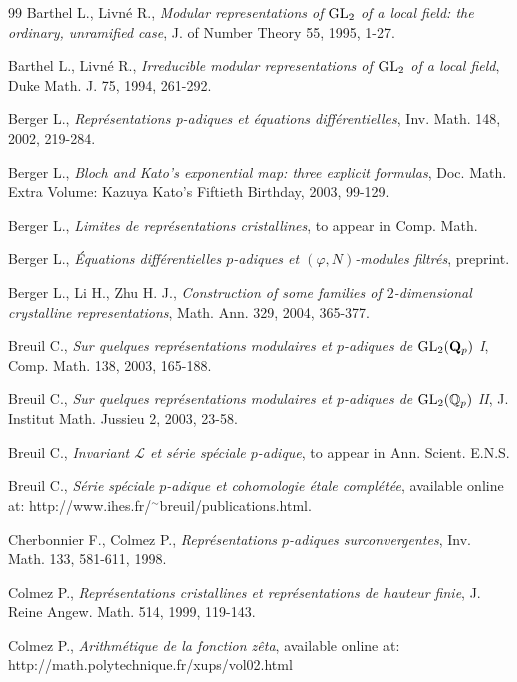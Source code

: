 \documentclass[11pt]{amsart}
\def\Q{{\mathbb Q}_p}
\begin{document}
  
\begin{thebibliography}{99} 
\normalsize
{} Barthel L., Livn\'e R., {\it Modular representations of
  ${\rm GL}_2$ of a local field: the ordinary, unramified case}, J. of
  Number Theory 55, 1995, 1-27.  

 Barthel L., Livn\'e R., {\it Irreducible modular
  representations of ${\rm GL}_2$ of a local field}, Duke Math. J. 75,
  1994, 261-292.
 
 Berger L., {\it Repr\'esentations p-adiques et  
\'equations diff\'erentielles}, Inv. Math. 148, 2002, 219-284.
 
 Berger L., {\it Bloch and Kato's exponential map: three
  explicit formulas}, Doc. Math. Extra Volume: Kazuya Kato's Fiftieth
  Birthday, 2003, 99-129.
 
 Berger L., {\it Limites de repr\'esentations
  cristallines}, to appear in Comp. Math.
 
 Berger L., {\it \'Equations diff\'erentielles
  $p$-adiques et $(\varphi,N)$-modules filtr\'es}, preprint.

 Berger L., Li H., Zhu H. J., {\it Construction of some
  families of $2$-dimensional crystalline representations},
  Math. Ann. 329, 2004, 365-377.
 
 Breuil C., {\it Sur quelques repr\'esentations
  modulaires et $p$-adiques de ${\rm GL}_2({\bf Q}_p)$ I},
  Comp. Math. 138, 2003, 165-188.
 
 Breuil C., {\it Sur quelques repr\'esentations
  modulaires et $p$-adiques de ${\rm GL}_2(\Q)$ II}, J. Institut
  Math. Jussieu 2, 2003, 23-58.
 
 Breuil C., {\it Invariant $\mathcal L$ et s\'erie
  sp\'eciale $p$-adique}, to appear in Ann. Scient. E.N.S.
 
 Breuil C., {\it S\'erie sp\'eciale $p$-adique et
  cohomologie \'etale compl\'et\'ee}, available online at:
  http://www.ihes.fr/${}^{\sim}$breuil/publications.html.
  
 Cherbonnier F., Colmez P., {\it Repr\'esentations
  $p$-adiques surconvergentes}, Inv. Math. 133, 581-611, 1998.
 
 Colmez P., {\it Repr\'esentations cristallines et
  repr\'esentations de hauteur finie}, J. Reine Angew. Math. 514,
  1999, 119-143.
 
 Colmez P., {\it Arithm\'etique de la fonction z\^eta},
  available online at: http://math.polytechnique.fr/xups/vol02.html
 

\end{thebibliography}
\end{document}
